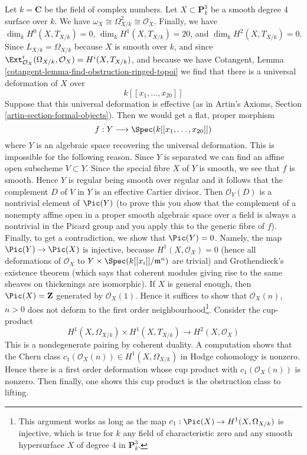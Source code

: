 \medskip\noindent
Let $k = \mathbf{C}$ be the field of complex numbers.
Let $X \subset \mathbf{P}^3_k$ be a smooth degree
$4$ surface over $k$. We have
$\omega_X \cong \Omega^2_{X/k} \cong \mathcal{O}_X$.
Finally, we have
$\dim_k H^0(X, T_{X/k}) = 0$,
$\dim_k H^1(X, T_{X/k}) = 20$, and
$\dim_k H^2(X, T_{X/k}) = 0$.
Since $L_{X/k} = \Omega_{X/k}$ because $X$ is smooth over $k$,
and since $\Ext^i_{\mathcal{O}_X}(\Omega_{X/k}, \mathcal{O}_X) =
H^i(X, T_{X/k})$, and because we have Cotangent, Lemma
\ref{cotangent-lemma-find-obstruction-ringed-topoi}
we find that there is a universal deformation of $X$
over
$$
k[[x_1, \ldots, x_{20}]]
$$
Suppose that this universal deformation is effective
(as in Artin's Axioms, Section \ref{artin-section-formal-objects}).
Then we would get a flat, proper morphism
$$
f : Y \longrightarrow \Spec(k[[x_1, \ldots, x_{20}]])
$$
where $Y$ is an algebraic space recovering the universal deformation.
This is impossible for the following reason. Since $Y$ is separated
we can find an affine open subscheme $V \subset Y$. Since the special
fibre $X$ of $Y$ is smooth, we see that $f$ is smooth. Hence $Y$
is regular being smooth over regular and it follows
that the complement $D$ of $V$ in $Y$ is an effective Cartier divisor.
Then $\mathcal{O}_Y(D)$ is a nontrivial element of $\Pic(Y)$
(to prove this you show that the complement of a nonempty affine open in
a proper smooth algebraic space over a field is always a nontrivial
in the Picard group and you apply this to the generic fibre of $f$).
Finally, to get a contradiction, we show that $\Pic(Y) = 0$.
Namely, the map $\Pic(Y) \to \Pic(X)$ is injective,
because $H^1(X, \mathcal{O}_X) = 0$ (hence all deformations of
$\mathcal{O}_X$ to $Y \times \Spec(k[[x_i]]/\mathfrak m^n)$
are trivial) and Grothendieck's existence theorem
(which says that coherent modules giving rise to the
same sheaves on thickenings are isomorphic).
If $X$ is general enough, then $\Pic(X) = \mathbf{Z}$
generated by $\mathcal{O}_X(1)$. Hence it suffices to show that
$\mathcal{O}_X(n)$, $n > 0$ does not deform to the first
order neighbourhood\footnote{This argument works as long as
the map $c_1 : \Pic(X) \to H^1(X, \Omega_{X/k})$
is injective, which is true for $k$ any field of characteristic zero
and any smooth hypersurface $X$ of degree $4$ in $\mathbf{P}^3_k$.}.
Consider the cup-product
$$
H^1(X, \Omega_{X/k}) \times H^1(X, T_{X/k})
\longrightarrow H^2(X, \mathcal{O}_X)
$$
This is a nondegenerate pairing by coherent duality.
A computation shows that the Chern class
$c_1(\mathcal{O}_X(n)) \in H^1(X, \Omega_{X/k})$
in Hodge cohomology is nonzero.
Hence there is a first order deformation
whose cup product with $c_1(\mathcal{O}_X(n))$ is nonzero.
Then finally, one shows this cup product is the obstruction
class to lifting.

